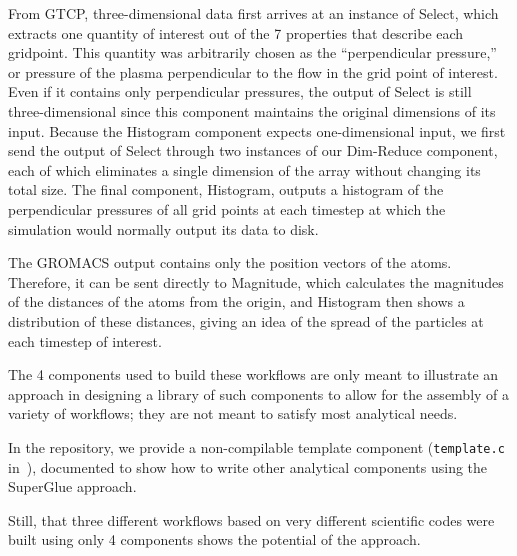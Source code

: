 From GTCP, three-dimensional data first
arrives at an instance of Select, which extracts
one quantity of interest out of the 7 properties that describe each gridpoint.
This quantity was arbitrarily chosen as the ``perpendicular
pressure,'' or pressure of the plasma perpendicular to the flow in the grid
point of interest. Even if it contains only perpendicular pressures, the output
of Select is still three-dimensional since this component maintains the
original dimensions of its input. Because the Histogram component expects
one-dimensional input, we first send the output of Select through two instances
of our Dim-Reduce component, each of which eliminates a single dimension of the
array without changing its total size. The final component, Histogram, outputs
a histogram of the perpendicular pressures of all grid points at each timestep
at which the simulation would normally output its data to disk.

The GROMACS output
contains only the
position vectors
of the atoms.
Therefore, it can be sent directly to
Magnitude, which calculates
the magnitudes of the distances of the atoms from
the origin, and Histogram then shows a distribution
of these distances, giving an idea of the spread
of the particles at each timestep of interest.

The 4 components used to build these workflows
are only meant to illustrate an approach
in designing a library of such components
to allow for the assembly of a variety of workflows;
they are not meant to satisfy most analytical needs.

In the repository, we provide a non-compilable
template component
(\verb|template.c| in~\cite{champsaur:superglue-repo}),
documented to show
how to write other analytical
components using the SuperGlue approach.

Still, that three different workflows based
on very different scientific codes were built using
only 4 components shows the potential of the approach.
